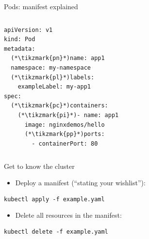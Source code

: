 \begin{frame}[fragile]{Pods: manifest explained}
  \begin{columns}[T]
      \begin{yamlbox}
\begin{lstlisting}[style=wsyamlstyle, basicstyle=\ttfamily\scriptsize]
apiVersion: v1
kind: Pod
metadata:
  (*\tikzmark{pn}*)name: app1
  namespace: my-namespace
  (*\tikzmark{pl}*)labels:
    exampleLabel: my-app1
spec:
  (*\tikzmark{pc}*)containers:
    (*\tikzmark{pi}*)- name: app1
      image: nginxdemos/hello
      (*\tikzmark{pp}*)ports:
        - containerPort: 80
\end{lstlisting}
      \end{yamlbox}
  \end{columns}
\end{frame}

\begin{frame}[fragile]{Get to know the cluster}
  \begin{itemize}\item Deploy a manifest (``stating your wishlist''):\end{itemize}
  \begin{termbox}
\begin{lstlisting}[style=wstermstyle]
kubectl apply -f example.yaml
\end{lstlisting}
  \end{termbox}
  \begin{itemize}\item Delete all resources in the manifest:\end{itemize}
  \begin{termbox}
\begin{lstlisting}[style=wstermstyle]
kubectl delete -f example.yaml
\end{lstlisting}
  \end{termbox}
\end{frame}

